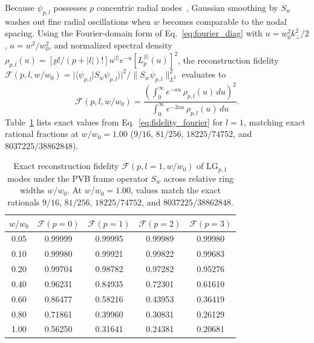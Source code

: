 \documentclass[aps,pra,reprint,amsmath,amssymb,floatfix,longbibliography]{revtex4-2}
\providecommand{\braket}[2]{\langle#1\vert#2\rangle}
\providecommand{\abs}[1]{\lvert#1\rvert}
\providecommand{\norm}[1]{\lVert#1\rVert}
\begin{document}
Because $\psi_{p,l}$ possesses $p$ concentric radial nodes~\cite{Allen1992,Siegman1986,Walborn2010}, Gaussian smoothing by $S_w$ washes out fine radial oscillations when $w$ becomes comparable to the nodal spacing. Using the Fourier-domain form of Eq.~\eqref{eq:fourier_diag} with $u = w_0^2 k_\perp^2/2$, $a = w^2/w_0^2$, and normalized spectral density $\rho_{p,l}(u) = [p!/(p+\abs{l})!]u^{\abs{l}} e^{-u}[L_p^{\abs{l}}(u)]^2$, the reconstruction fidelity $\mathcal{F}(p,l,w/w_0) = \abs{\braket{\psi_{p,l}}{S_w\psi_{p,l}}}^2/\norm{S_w\psi_{p,l}}_{L^2}^2$ evaluates to
\begin{equation}
\mathcal{F}(p,l,w/w_0) = \frac{\left(\int_0^\infty e^{-au}\,\rho_{p,l}(u)\,du\right)^2}{\int_0^\infty e^{-2au}\,\rho_{p,l}(u)\,du}.
\label{eq:fidelity_fourier}
\end{equation}
Table~\ref{tab:fidelity} lists exact values from Eq.~\eqref{eq:fidelity_fourier} for $l=1$, matching exact rational fractions at $w/w_0 = 1.00$ ($9/16$, $81/256$, $18225/74752$, and $8037225/38862848$).

\begin{table}[t]
\caption{Exact reconstruction fidelity $\mathcal{F}(p, l=1, w/w_0)$ of $\mathrm{LG}_{p,1}$ modes under the PVB frame operator $S_w$ across relative ring widths $w/w_0$. At $w/w_0 = 1.00$, values match the exact rationals $9/16$, $81/256$, $18225/74752$, and $8037225/38862848$.}
\label{tab:fidelity}
\begin{ruledtabular}
\setlength{\tabcolsep}{3pt}
\begin{tabular}{ccccc}
$w / w_0$ & $\mathcal{F}(p=0)$ & $\mathcal{F}(p=1)$ & $\mathcal{F}(p=2)$ & $\mathcal{F}(p=3)$ \\
\hline
0.05 & 0.99999 & 0.99995 & 0.99989 & 0.99980 \\
0.10 & 0.99980 & 0.99921 & 0.99822 & 0.99683 \\
0.20 & 0.99704 & 0.98782 & 0.97282 & 0.95276 \\
0.40 & 0.96231 & 0.84935 & 0.72301 & 0.61610 \\
0.60 & 0.86477 & 0.58216 & 0.43953 & 0.36419 \\
0.80 & 0.71861 & 0.39960 & 0.30831 & 0.26129 \\
1.00 & 0.56250 & 0.31641 & 0.24381 & 0.20681 \\
\end{tabular}
\end{ruledtabular}
\end{table}
\end{document}

